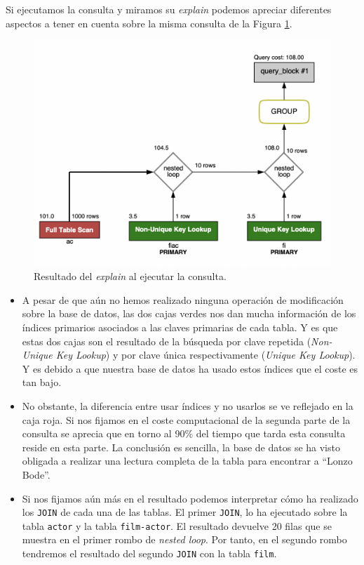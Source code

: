 \documentclass[a4paper]{article}
\begin{document}
Si ejecutamos la consulta y miramos su \emph{explain} podemos apreciar diferentes aspectos a tener en cuenta sobre la misma consulta de la Figura \ref{fig:ejecucion1}.

\begin{figure}[ht]
    \centering
    \includegraphics[width=0.8\columnwidth]{figs/ejecucion1.png}
    \caption{Resultado del \emph{explain} al ejecutar la consulta.}\label{fig:ejecucion1}
\end{figure}

\begin{itemize}
    \item A pesar de que aún no hemos realizado ninguna operación de modificación sobre la base de datos, las dos cajas verdes nos dan mucha información de los índices primarios asociados a las claves primarias de cada tabla. Y es que estas dos cajas son el resultado de la búsqueda por clave repetida (\emph{Non-Unique Key Lookup}) y por clave única respectivamente (\emph{Unique Key Lookup}). Y es debido a que nuestra base de datos ha usado estos índices que el coste es tan bajo.
    \item No obstante, la diferencia entre usar índices y no usarlos se ve reflejado en la caja roja. Si nos fijamos en el coste computacional de la segunda parte de la consulta se aprecia que en torno al 90\% del tiempo que tarda esta consulta reside en esta parte. La conclusión es sencilla, la base de datos se ha visto obligada a realizar una lectura completa de la tabla para encontrar a ``Lonzo Bode''.
    \item Si nos fijamos aún más en el resultado podemos interpretar cómo ha realizado los \texttt{JOIN} de cada una de las tablas. El primer \texttt{JOIN}, lo ha ejecutado sobre la tabla \texttt{actor} y la tabla \texttt{film-actor}. El resultado devuelve 20 filas que se muestra en el primer rombo de \emph{nested loop}. Por tanto, en el segundo rombo tendremos el resultado del segundo  \texttt{JOIN} con la tabla \texttt{film}.
\end{itemize}
\end{document}

